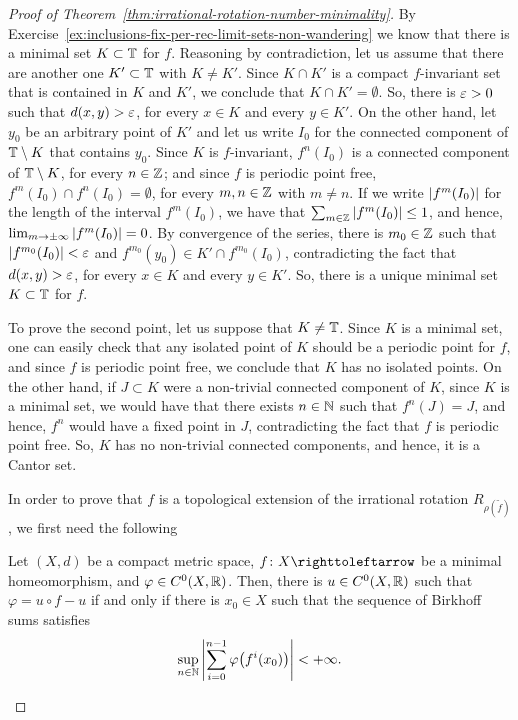 \begin{proof}[Proof of Theorem~\ref{thm:irrational-rotation-number-minimality}]
  By Exercise~\ref{ex:inclusions-fix-per-rec-limit-sets-non-wandering} we know that there is a minimal set $K\subset\mathbb{T}$ for $f$. Reasoning by contradiction, let us assume that there are another one $K'\subset\mathbb{T}$ with $K\neq K'$. Since $K\cap K'$ is a compact $f$-invariant set that is contained in $K$ and $K'$, we conclude that $K\cap K'=\emptyset$. So, there is $\varepsilon>0$ such that $d(x,y)>\varepsilon$, for every $x\in K$ and every $y\in K'$. On the other hand, let $y_0$ be an arbitrary point of $K'$ and let us write $I_0$ for the connected component of $\mathbb{T}\setminus K$ that contains $y_0$. Since $K$ is $f$-invariant, $f^n(I_0)$ is a connected component of $\mathbb{T}\setminus K$, for every $n\in\mathbb{Z}$; and since $f$ is periodic point free, $f^m(I_0)\cap f^n(I_0)=\emptyset$, for every $m,n\in\mathbb{Z}$ with $m\neq n$. If we write $\left\lvert{f^m(I_0)}\right\rvert$ for the length of the interval $f^m(I_0)$, we have that $\sum_{m\in\mathbb{Z}} \left\lvert{f^m(I_0)}\right\rvert\leq 1$, and hence, $\lim_{m\to\pm\infty} \left\lvert{f^m(I_0)}\right\rvert=0$. By convergence of the series, there is $m_0\in\mathbb{Z}$ such that $\left\lvert{f^{m_0}(I_0)}\right\rvert<\varepsilon$ and $f^{m_0}(y_0)\in K'\cap f^{m_0}(I_0)$, contradicting the fact that $d(x,y)>\varepsilon$, for every $x\in K$ and every $y\in K'$. So, there is a unique minimal set $K\subset\mathbb{T}$ for $f$.

  To prove the second point, let us suppose that $K\neq\mathbb{T}$. Since $K$ is a minimal set, one can easily check that any isolated point of $K$ should be a periodic point for $f$, and since $f$ is periodic point free, we conclude that $K$ has no isolated points. On the other hand, if $J\subset K$ were a non-trivial connected component of $K$, since $K$ is a minimal set, we would have that there exists $n\in\mathbb{N}$ such that $f^n(J)=J$, and hence, $f^n$ would have a fixed point in $J$, contradicting the fact that $f$ is periodic point free. So, $K$ has no non-trivial connected components, and hence, it is a Cantor set.

  In order to prove that $f$ is a topological extension of the irrational rotation $R_{\rho(\tilde f)}$, we first need the following

  \begin{theorem}
    \label{thm:Gottschalk-Hedlund}
    Let $(X,d)$ be a compact metric space, $f\colon X\carr$ be a minimal homeomorphism, and $\varphi\in C^0(X,\mathbb{R})$. Then, there is $u\in C^0(X,\mathbb{R})$ such that $\varphi=u\circ f-u$ if and only if there is $x_0\in X$ such that the sequence of Birkhoff sums satisfies
    \begin{displaymath}
      \sup_{n\in\mathbb{N}} \left\lvert{\sum_{i=0}^{n-1} \varphi\big(f^i(x_0)\big)}\right\rvert<+\infty.
    \end{displaymath}
  \end{theorem}


\end{proof}
